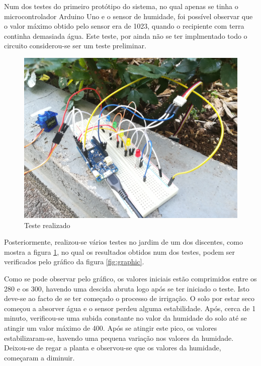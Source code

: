 \documentclass[conference]{IEEEtran}
\begin{document}
Num dos testes do primeiro protótipo do sistema, no qual apenas se tinha o microcontrolador
Arduino Uno e o sensor de humidade, foi possível observar que o valor máximo obtido pelo sensor 
era de 1023, quando o recipiente com terra continha demasiada água. Este teste, por ainda 
não se ter implmentado todo o circuito considerou-se ser um teste preliminar.

\begin{figure}[h]
    \centering
    \includegraphics[scale=0.06]{sistema-de-rega-teste-ambiente-real.jpg}
    \caption{Teste realizado}
    \label{fig:teste}
\end{figure}

Posteriormente, realizou-se vários testes no jardim de um dos discentes, como mostra a figura \ref{fig:teste}, 
no qual os resultados obtidos num dos testes, podem ser verificados pelo gráfico da figura \ref{fig:graphic}. 

Como se pode observar pelo gráfico, os valores iniciais estão comprimidos entre os 280 e os 300, 
havendo uma descida abruta logo após se ter iniciado o teste. Isto deve-se ao facto de se ter começado 
o processo de irrigação. O solo por estar seco começou a absorver água e o sensor perdeu alguma estabilidade.
Após, cerca de 1 minuto, verificou-se uma subida constante no valor da humidade do solo até se atingir 
um valor máximo de 400. Após se atingir este pico, os valores estabilizaram-se, havendo uma pequena variação 
nos valores da humidade. Deixou-se de regar a planta e observou-se que os valores da humidade, começaram 
a diminuir.
\end{document}

